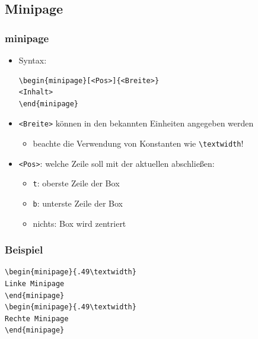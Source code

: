 \subsection{Minipage}

\begin{frame}[fragile]
\frametitle{minipage}
\begin{itemize}[<+->]
  \item Syntax: 
  \begin{lstlisting}[style=Latex]
\begin{minipage}[<Pos>]{<Breite>}
<Inhalt>
\end{minipage}
\end{lstlisting}\vspace{-20pt}
  \item \texttt{<Breite>} können in den bekannten Einheiten angegeben werden
  \begin{itemize}
    \item beachte die Verwendung von Konstanten wie \lstinline[style=Latex]+\textwidth+!
  \end{itemize}
  \item \texttt{<Pos>}: welche Zeile soll mit der aktuellen abschließen:
  \begin{itemize}
    \item \texttt{t}: oberste Zeile der Box
    \item \texttt{b}: unterste Zeile der Box
    \item nichts: Box wird zentriert
  \end{itemize}
\end{itemize}
\end{frame}



\begin{frame}[fragile,t]
\frametitle{Beispiel}
\begin{lstlisting}[style=Latex]
\begin{minipage}{.49\textwidth}
Linke Minipage
\end{minipage}
\begin{minipage}{.49\textwidth}
Rechte Minipage
\end{minipage}
\end{lstlisting}\pause
{}

\end{frame}
